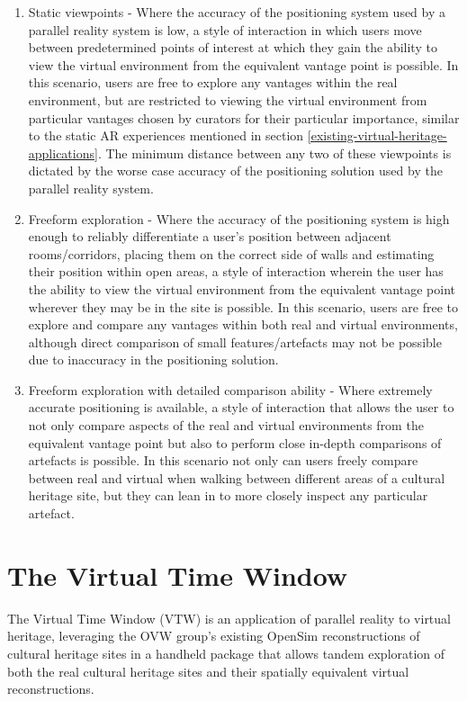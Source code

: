 \begin{enumerate}
	\item Static viewpoints - Where the accuracy of the positioning system used by a parallel reality system is low, a style of interaction in which users move between predetermined points of interest at which they gain the ability to view the virtual environment from the equivalent vantage point is possible. In this scenario, users are free to explore any vantages within the real environment, but are restricted to viewing the virtual environment from particular vantages chosen by curators for their particular importance, similar to the static AR experiences mentioned in section \ref{existing-virtual-heritage-applications}. The minimum distance between any two of these viewpoints is dictated by the worse case accuracy of the positioning solution used by the parallel reality system.
	
	\item Freeform exploration - Where the accuracy of the positioning system is high enough to reliably differentiate a user's position between adjacent rooms/corridors, placing them on the correct side of walls and estimating their position within open areas, a style of interaction wherein the user has the ability to view the virtual environment from the equivalent vantage point wherever they may be in the site is possible. In this scenario, users are free to explore and compare any vantages within both real and virtual environments, although direct comparison of small features/artefacts may not be possible due to inaccuracy in the positioning solution.
	
	\item Freeform exploration with detailed comparison ability - Where extremely accurate positioning is available, a style of interaction that allows the user to not only compare aspects of the real and virtual environments from the equivalent vantage point but also to perform close in-depth comparisons of artefacts is possible. In this scenario not only can users freely compare between real and virtual when walking between different areas of a cultural heritage site, but they can lean in to more closely inspect any particular artefact.
\end{enumerate}


\section{The Virtual Time Window}
The Virtual Time Window (VTW) is an application of parallel reality to virtual heritage, leveraging the OVW group's existing OpenSim reconstructions of cultural heritage sites in a handheld package that allows tandem exploration of both the real cultural heritage sites and their spatially equivalent virtual reconstructions.

